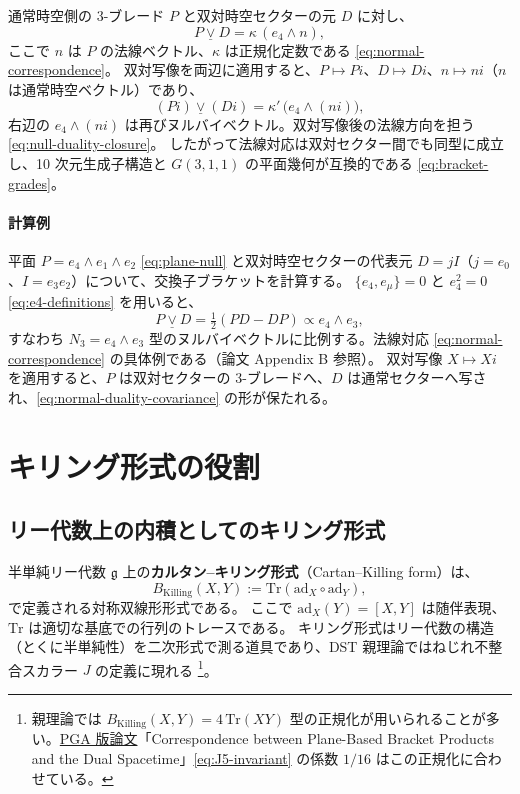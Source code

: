 \documentclass[dvipdfmx,a4paper,oneside]{jsbook}
\numberwithin{equation}{chapter}
\begin{document}
通常時空側の 3-ブレード \(P\) と双対時空セクターの元 \(D\) に対し、
\begin{equation}
  P \mathbin{\underline{\vee}} D = \kappa\,(e_4 \wedge n),
\end{equation}
ここで \(n\) は \(P\) の法線ベクトル、\(\kappa\) は正規化定数である \eqref{eq:normal-correspondence}。
双対写像を両辺に適用すると、\(P \mapsto P i\)、\(D \mapsto D i\)、\(n \mapsto n i\)（\(n\) は通常時空ベクトル）であり、
\begin{equation}
  (P i) \mathbin{\underline{\vee}} (D i)
  = \kappa'\, \bigl(e_4 \wedge (n i)\bigr),
  \label{eq:normal-duality-covariance}
\end{equation}
右辺の \(e_4 \wedge (n i)\) は再びヌルバイベクトル。双対写像後の法線方向を担う \eqref{eq:null-duality-closure}。
したがって法線対応は双対セクター間でも同型に成立し、10 次元生成子構造と \(G(3,1,1)\) の平面幾何が互換的である \eqref{eq:bracket-grades}。

\paragraph{計算例}
平面 \(P = e_4 \wedge e_1 \wedge e_2\) \eqref{eq:plane-null} と双対時空セクターの代表元 \(D = jI\)（\(j = e_0\)、\(I = e_3 e_2\)）について、交換子ブラケットを計算する。
\(\{e_4, e_\mu\} = 0\) と \(e_4^2 = 0\) \eqref{eq:e4-definitions} を用いると、
\[
  P \mathbin{\underline{\vee}} D
  = \tfrac{1}{2}(PD - DP)
  \propto e_4 \wedge e_3,
\]
すなわち \(N_3 = e_4 \wedge e_3\) 型のヌルバイベクトルに比例する。法線対応 \eqref{eq:normal-correspondence} の具体例である（論文 Appendix B 参照）。
双対写像 \(X \mapsto Xi\) を適用すると、\(P\) は双対セクターの 3-ブレードへ、\(D\) は通常セクターへ写され、\eqref{eq:normal-duality-covariance} の形が保たれる。

\section{キリング形式の役割}

\subsection{リー代数上の内積としてのキリング形式}

半単純リー代数 \(\mathfrak{g}\) 上の\textbf{カルタン--キリング形式}（Cartan--Killing form）は、
\begin{equation}
  B_{\mathrm{Killing}}(X, Y)
  := \mathrm{Tr}(\mathrm{ad}_X \circ \mathrm{ad}_Y),
  \label{eq:killing-def}
\end{equation}
で定義される対称双線形形式である。
ここで \(\mathrm{ad}_X(Y) = [X,Y]\) は随伴表現、\(\mathrm{Tr}\) は適切な基底での行列のトレースである。
キリング形式はリー代数の構造（とくに半単純性）を二次形式で測る道具であり、DST 親理論ではねじれ不整合スカラー \(J\) の定義に現れる \footnote{親理論では \(B_{\mathrm{Killing}}(X,Y) = 4\,\mathrm{Tr}(XY)\) 型の正規化が用いられることが多い。\hyperref[sec:sister-manuscripts]{PGA 版論文}「Correspondence between Plane-Based Bracket Products and the Dual Spacetime」\eqref{eq:J5-invariant} の係数 \(1/16\) はこの正規化に合わせている。}。
\end{document}
